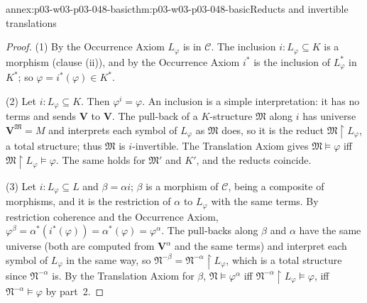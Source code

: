 \begin{annexitem}{annex:p03-w03-p03-048-basic}{thm:p03-w03-p03-048-basic}{Reducts and invertible translations}
\begin{proof}
(1) By the Occurrence Axiom \(L_\varphi\) is in \(\mathcal C\).  The inclusion
\(i:L_\varphi\subseteq K\) is a morphism (clause (ii)), and by the Occurrence
Axiom \(i^{\ast}\) is the inclusion of \(L_\varphi^{\ast}\) in \(K^{\ast}\);
so \(\varphi=i^{\ast}(\varphi)\in K^{\ast}\).

(2) Let \(i:L_\varphi\subseteq K\).  Then \(\varphi^{i}=\varphi\).  An
inclusion is a simple interpretation: it has no terms and sends
\(\mathbf V\) to \(\mathbf V\).  The pull-back of a \(K\)-structure
\(\mathfrak M\) along \(i\) has universe \(\mathbf V^{\mathfrak M}=M\) and
interprets each symbol of \(L_\varphi\) as \(\mathfrak M\) does, so it is the
reduct \(\mathfrak M\restriction L_\varphi\), a total structure; thus
\(\mathfrak M\) is \(i\)-invertible.  The Translation Axiom gives
\(\mathfrak M\models\varphi\) iff \(\mathfrak M\restriction L_\varphi\models
\varphi\).  The same holds for \(\mathfrak M'\) and \(K'\), and the reducts
coincide.

(3) Let \(i:L_\varphi\subseteq L\) and \(\beta=\alpha i\); \(\beta\) is a
morphism of \(\mathcal C\), being a composite of morphisms, and it is the
restriction of \(\alpha\) to \(L_\varphi\) with the same terms.  By
restriction coherence and the Occurrence Axiom,
\(\varphi^{\beta}=\alpha^{\ast}(i^{\ast}(\varphi))=\alpha^{\ast}(\varphi)=
\varphi^{\alpha}\).  The pull-backs along \(\beta\) and \(\alpha\) have the
same universe (both are computed from \(\mathbf V^{\alpha}\) and the same
terms) and interpret each symbol of \(L_\varphi\) in the same way, so
\(\mathfrak N^{-\beta}=\mathfrak N^{-\alpha}\restriction L_\varphi\), which
is a total structure since \(\mathfrak N^{-\alpha}\) is.  By the Translation
Axiom for \(\beta\), \(\mathfrak N\models\varphi^{\alpha}\) iff
\(\mathfrak N^{-\alpha}\restriction L_\varphi\models\varphi\), iff
\(\mathfrak N^{-\alpha}\models\varphi\) by part~2.
\end{proof}
\end{annexitem}

